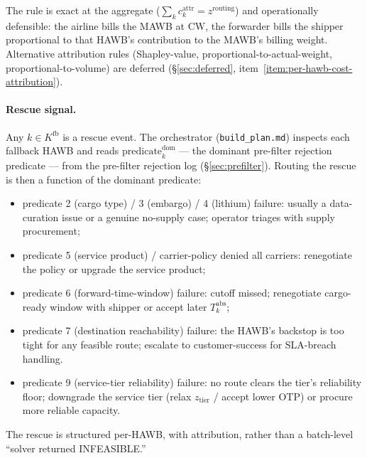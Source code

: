\documentclass[11pt,a4paper]{article}
\theoremstyle{definition}
\begin{document}
The rule is exact at the aggregate ($\sum_k c_k^{\text{attr}} =
z^{\text{routing}}$) and operationally defensible: the airline bills the
MAWB at $\text{CW}$, the forwarder bills the shipper proportional to that
HAWB's contribution to the MAWB's billing weight. Alternative attribution
rules (Shapley-value, proportional-to-actual-weight,
proportional-to-volume) are deferred (\S\ref{sec:deferred},
item~\ref{item:per-hawb-cost-attribution}).

\paragraph{Rescue signal.}
Any $k \in K^{\text{fb}}$ is a rescue event. The orchestrator
(\texttt{build\_plan.md}) inspects each fallback HAWB and reads
$\text{predicate}^{\text{dom}}_k$ --- the dominant pre-filter
rejection predicate --- from the pre-filter rejection log
(\S\ref{sec:prefilter}). Routing the rescue is then a function of the
dominant predicate:
\begin{itemize}[noitemsep]
  \item predicate 2 (cargo type) / 3 (embargo) / 4 (lithium) failure:
        usually a data-curation issue or a genuine no-supply case;
        operator triages with supply procurement;
  \item predicate 5 (service product) / carrier-policy denied all
        carriers: renegotiate the policy or upgrade the service
        product;
  \item predicate 6 (forward-time-window) failure: cutoff missed;
        renegotiate cargo-ready window with shipper or accept later
        $T_k^{\text{abs}}$;
  \item predicate 7 (destination reachability) failure: the HAWB's
        backstop is too tight for any feasible route; escalate to
        customer-success for SLA-breach handling.
  \item predicate 9 (service-tier reliability) failure: no route clears
        the tier's reliability floor; downgrade the service tier (relax
        $z_{\text{tier}}$ / accept lower OTP) or procure more reliable
        capacity.
\end{itemize}
The rescue is structured per-HAWB, with attribution, rather than a
batch-level ``solver returned INFEASIBLE.''
\end{document}
